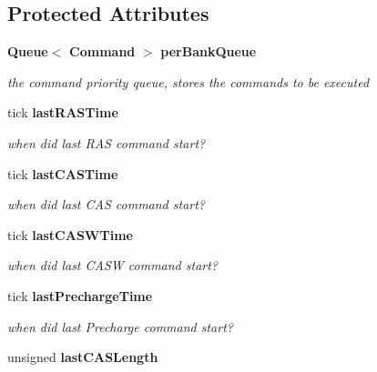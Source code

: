 \subsection*{Protected Attributes}
\begin{DoxyCompactItemize}
\item 
{\bf Queue}$<$ {\bf Command} $>$ {\bf perBankQueue}\label{class_d_r_a_msim_i_i_1_1_bank_a6e2ca8ec2f63931e083a03f8143684a2}

\begin{DoxyCompactList}\small\item\em the command priority queue, stores the commands to be executed \item\end{DoxyCompactList}\item 
tick {\bf lastRASTime}\label{class_d_r_a_msim_i_i_1_1_bank_aae46b468fcd2d6357a3cfb3345752393}

\begin{DoxyCompactList}\small\item\em when did last RAS command start? \item\end{DoxyCompactList}\item 
tick {\bf lastCASTime}\label{class_d_r_a_msim_i_i_1_1_bank_a9638ce1c0abbed003ee7e015cf719654}

\begin{DoxyCompactList}\small\item\em when did last CAS command start? \item\end{DoxyCompactList}\item 
tick {\bf lastCASWTime}\label{class_d_r_a_msim_i_i_1_1_bank_a73c5d235d450948bc2dde4001a2f00d6}

\begin{DoxyCompactList}\small\item\em when did last CASW command start? \item\end{DoxyCompactList}\item 
tick {\bf lastPrechargeTime}\label{class_d_r_a_msim_i_i_1_1_bank_acfa7062dc21939cca1cd738f9067dd02}

\begin{DoxyCompactList}\small\item\em when did last Precharge command start? \item\end{DoxyCompactList}\item 
unsigned {\bf lastCASLength}\label{class_d_r_a_msim_i_i_1_1_bank_a83398f833decb4c62bc2217370d5ba0b}


\end{DoxyCompactItemize}
